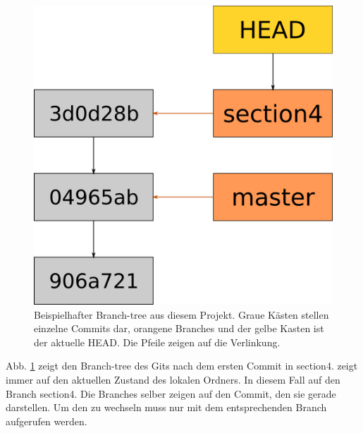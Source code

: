 \begin{figure}
	\centering
	\includegraphics[widht=0.6\textwidth]{Bilder/branching.png}
	\caption{Beispielhafter Branch-tree aus diesem Projekt. Graue Kästen stellen einzelne Commits dar, orangene Branches und der gelbe Kasten ist der aktuelle HEAD. Die Pfeile zeigen auf die Verlinkung.}
	\label{fig:branch_1}
\end{figure}
Abb. \ref{fig:branch_1} zeigt den Branch-tree des Gits nach dem ersten Commit in section4.  zeigt immer auf den aktuellen Zustand des lokalen Ordners. In diesem Fall auf den Branch section4. Die Branches selber zeigen auf den Commit, den sie gerade darstellen. Um den  zu wechseln muss nur  mit dem entsprechenden Branch aufgerufen werden.